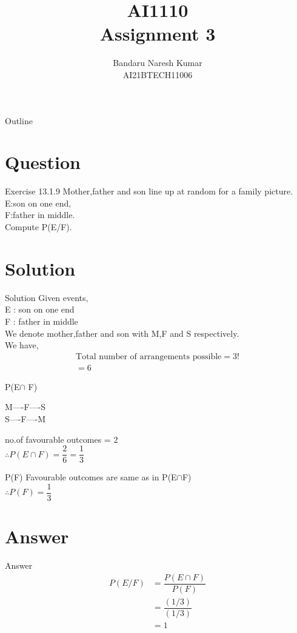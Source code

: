\documentclass{beamer}
\title{AI1110 \\ Assignment 3}
\author{Bandaru Naresh Kumar \\ AI21BTECH11006}
\date{}
\begin{document}
	\begin{frame}
		\titlepage
	\end{frame}
	
	\begin{frame}{Outline}
    		\tableofcontents
	\end{frame}
	
	\section{Question}
	\begin{frame}{Exercise 13.1.9}
	Mother,father and son line up at random for a family picture.\\
E:son on one end,\\
F:father in middle.\\
Compute P(E/F).
	\end{frame}
	
	\section{Solution}
	\begin{frame}{Solution}
	Given events,\\
 E : son on one end\\
 F : father in middle\\
 We denote mother,father and son with M,F and S respectively.\\
We have,
\begin{align}
  \text{Total number of  arrangements possible} = 3!\\
                                                = 6
\end{align}
	\end{frame}
		
	\begin{frame}{P(E$\cap$ F)}
	\begin{center}
M----F----S\\
S----F----M\\
\end{center}
 no.of favourable outcomes = 2\\
 $\therefore P(E \cap F) = \dfrac{2}{6} = \dfrac{1}{3}$
	\end{frame}

	\begin{frame}{P(F)}
	 Favourable outcomes are same as in P(E$\cap$F)\\
 $\therefore P(F) =  \dfrac{1}{3}$\\
	\end{frame}
	
	\section{Answer}
	\begin{frame}{Answer}
	\begin{align}
  P(E/F) &= \dfrac{P(E \cap F)}{P(F)}\\
         &= \dfrac{(1/3)}{(1/3)}\\
         &= 1
    \end{align}     
	\end{frame}
	
\end{document}
